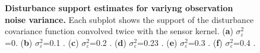 \documentclass[]{article}
\begin{document}
\begin{figure}[!ht]
\caption{{\bf Disturbance support estimates for variyng observation noise variance.} Each subplot shows the support of the disturbance covariance function convolved twice with the sensor kernel. (\textbf a) $\sigma_{\varepsilon}^2$=0. (\textbf b) $\sigma_{\varepsilon}^2$=0.1 . (\textbf c) $\sigma_{\varepsilon}^2$=0.2 .  (\textbf d) $\sigma_{\varepsilon}^2$=0.23 .  (\textbf e) $\sigma_{\varepsilon}^2$=0.3 . (\textbf f) $\sigma_{\varepsilon}^2$=0.4 .}
\label{fig:DisturbanceSupportExperiment}
\end{figure}
\end{document}
